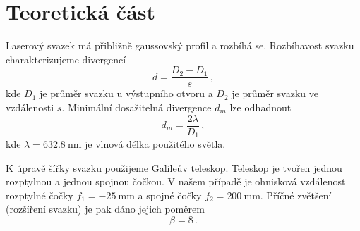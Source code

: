 \section*{Teoretická část}
Laserový svazek má přibližně gaussovský profil a rozbíhá se.
Rozbíhavost svazku charakterizujeme divergencí\cite{skripta}
\begin{equation} \label{e:div}
d=\frac{D_2-D_1}{s} \,,
\end{equation}
kde $D_1$ je průměr svazku u výstupního otvoru a $D_2$ je průměr svazku ve vzdálenosti $s$.
Minimální dosažitelná divergence $d_m$ lze odhadnout\cite{skripta}
\begin{equation} \label{e:dmin}
d_m=\frac{2\lambda}{D_1} \,,
\end{equation}
kde $\lambda=\SI{632.8}{\nm}$ je vlnová délka použitého světla.


K úpravě šířky svazku použijeme Galileův teleskop. Teleskop je tvořen jednou rozptylnou a jednou spojnou čočkou. V našem případě je ohnisková vzdálenost rozptylné čočky $f_1=\SI{-25}{\mm}$ a spojné čočky $f_2=\SI{200}{\mm}$.
Příčné zvětšení (rozšíření svazku) je pak dáno jejich poměrem 
\begin{equation} \label{e:rozsireni}
\beta=\num{8} \,.
\end{equation}

